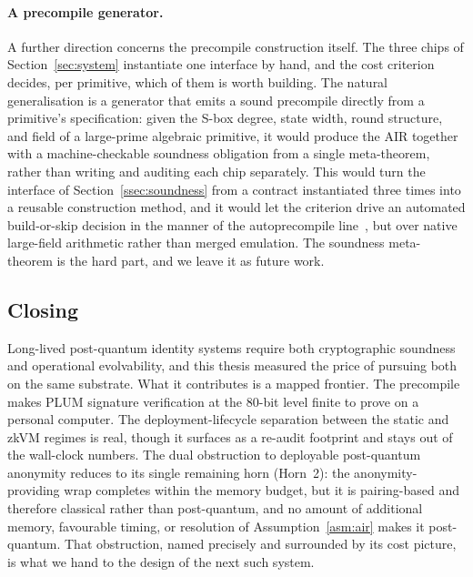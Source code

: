 \paragraph{A precompile generator.}
A further direction concerns the precompile construction itself. The three chips of Section~\ref{sec:system} instantiate one interface by hand, and the cost criterion decides, per primitive, which of them is worth building. The natural generalisation is a generator that emits a sound precompile directly from a primitive's specification: given the S-box degree, state width, round structure, and field of a large-prime algebraic primitive, it would produce the AIR together with a machine-checkable soundness obligation from a single meta-theorem, rather than writing and auditing each chip separately. This would turn the interface of Section~\ref{ssec:soundness} from a contract instantiated three times into a reusable construction method, and it would let the criterion drive an automated build-or-skip decision in the manner of the autoprecompile line~\cite{powdr2025autoprecompiles}, but over native large-field arithmetic rather than merged emulation. The soundness meta-theorem is the hard part, and we leave it as future work.

\subsection{Closing}\label{subsec:conclusion-closing}
Long-lived post-quantum identity systems require both cryptographic soundness and operational evolvability, and this thesis measured the price of pursuing both on the same substrate. What it contributes is a mapped frontier. The precompile makes PLUM signature verification at the $80$-bit level finite to prove on a personal computer. The deployment-lifecycle separation between the static and zkVM regimes is real, though it surfaces as a re-audit footprint and stays out of the wall-clock numbers. The dual obstruction to deployable post-quantum anonymity reduces to its single remaining horn (Horn~2): the anonymity-providing wrap completes within the memory budget, but it is pairing-based and therefore classical rather than post-quantum, and no amount of additional memory, favourable timing, or resolution of Assumption~\ref{asm:air} makes it post-quantum. That obstruction, named precisely and surrounded by its cost picture, is what we hand to the design of the next such system.
